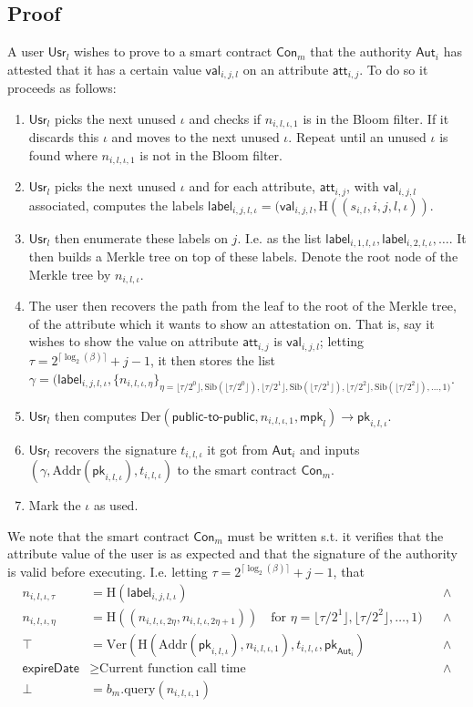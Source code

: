 \documentclass[11pt]{article} %
\newcommand{\Hash}{\ensuremath{\mathrm{H}}}
\newcommand{\aut}{\ensuremath{\mathsf{Aut}_i}}
\newcommand{\att}{\ensuremath{\mathsf{att}_{i,j}}}
\newcommand{\val}{\ensuremath{\mathsf{val}_{i,j,l}}}
\newcommand{\usr}{\ensuremath{\mathsf{Usr}_l}}
\newcommand{\con}{\ensuremath{\mathsf{Con}_m}}
\newcommand{\lab}{\ensuremath{\mathsf{label}}}
\newcommand{\mpk}{\ensuremath{\mathsf{mpk}}}
\newcommand{\pk}{\ensuremath{\mathsf{pk}}}
\newcommand{\expireDate}{\ensuremath{\mathsf{expireDate}}}
\newcommand{\Der}{\ensuremath{\mathrm{Der}}}
\newcommand{\Ver}{\ensuremath{\mathrm{Ver}}}
\newcommand{\Addr}{\ensuremath{\mathrm{Addr}}}
\newcommand{\Sib}{\ensuremath{\mathrm{Sib}}}
\newcommand{\query}{\ensuremath{\mathrm{query}}}
\begin{document}
\subsection{Proof}
A user $\usr$ wishes to prove to a smart contract $\con$ that the authority $\aut$ has attested that it has a certain value $\val$ on an attribute $\att$. To do so it proceeds as follows:
\begin{enumerate}
	\item $\usr$ picks the next unused $\iota$ and checks if $n_{i,l, \iota, 1}$ is in the Bloom filter. If it discards this $\iota$ and moves to the next unused $\iota$. Repeat until an unused $\iota$ is found where $n_{i,l, \iota, 1}$ is not in the Bloom filter.
	\item $\usr$ picks the next unused $\iota$ and for each attribute, $\att$, with $\val$ associated, computes the labels $\lab_{i,j,l,\iota}=(\val, \Hash((s_{i,l}, i, j, l, \iota))$.
	\item $\usr$ then enumerate these labels on $j$. I.e. as the list $\lab_{i,1,l,\iota}, \lab_{i,2,l,\iota}, \dots$. It then builds a Merkle tree on top of these labels. Denote the root node of the Merkle tree by $n_{i,l,\iota}$.
	\item The user then recovers the path from the leaf to the root of the Merkle tree, of the attribute which it wants to show an attestation on. That is, say it wishes to show the value on attribute $\att$ is $\val$; letting $\tau=2^{\lceil\log_2(\beta)\rceil}+j-1$, it then stores the list $\gamma=(\lab_{i,j,l,\iota}, \{n_{i,l, \iota, \eta}\}_{\eta =\lfloor\tau/2^0\rfloor, \Sib(\lfloor\tau/2^0\rfloor), \lfloor\tau/2^1\rfloor, \Sib(\lfloor\tau/2^1\rfloor), \lfloor\tau/2^2\rfloor, \Sib(\lfloor\tau/2^2\rfloor),\dots, 1)}$.
	\item $\usr$ then computes $\Der(\mathsf{public}\mbox{-}\mathsf{to}\mbox{-}\mathsf{public}, n_{i,l,\iota, 1}, \mpk_l)\to \pk_{i,l,\iota}$.
	\item $\usr$ recovers the signature $t_{i,l,\iota}$ it got from $\aut$ and inputs $(\gamma, \Addr(\pk_{i,l,\iota}), t_{i,l,\iota})$ to the smart contract $\con$.
	\item Mark the $\iota$ as used.
\end{enumerate}

We note that the smart contract $\con$ must be written s.t. it verifies that the attribute value of the user is as expected and that the signature of the authority is valid before executing. I.e. letting $\tau=2^{\lceil\log_2(\beta)\rceil}+j-1$, that 
\begin{align*}
n_{i, l, \iota, \tau } &= \Hash( \lab_{i,j,l,\iota} ) &&\wedge\\
n_{i, l, \iota, \eta} &= \Hash( (n_{i,l,\iota,  2 \eta}, n_{i,l,\iota, 2 \eta+1}) ) \quad \text{for } \eta= \lfloor\tau/2^1\rfloor, \lfloor\tau/2^2\rfloor, \dots, 1) &&\wedge\\
\top&=\Ver(\Hash(\Addr(\pk_{i,l,\iota}), n_{i,l,\iota, 1}), t_{i,l, \iota}, \pk_{\aut}) &&\wedge\\
\expireDate &\geq \text{Current function call time} &&\wedge\\
\bot &= b_m.\query(n_{i, l, \iota, 1})
\end{align*}
\end{document}
